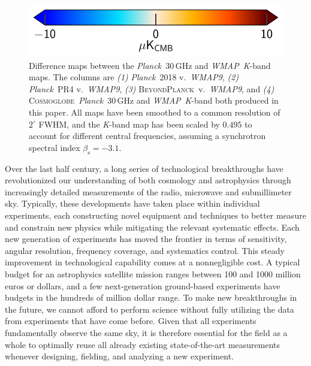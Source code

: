 \documentclass[twocolumn]{../../common/aa}
\def\WMAP{\emph{WMAP}}
\def\WMAPnine{\emph{WMAP9}}
\def\Planck{\emph{Planck}}
\newcommand{\BP}{\textsc{BeyondPlanck}}
\newcommand{\cosmoglobe}{\textsc{Cosmoglobe}}
\newcommand{\K}[0]{\textit K}
\begin{document}
\begin{figure}
        \hspace*{40mm}\includegraphics[width=0.25\textheight]{figures/cbar_10uK.pdf}
	\caption{Difference maps between the \Planck\ 30\,GHz and \WMAP\ \K-band maps. The columns are \textit{(1)} \Planck\ 2018 v.~\WMAPnine, \textit{(2)} \Planck\ PR4 v.~\WMAPnine, \textit{(3)} \BP\ v.~\WMAPnine, and \textit{(4)} \cosmoglobe\ \Planck\ 30\,GHz and \WMAP\ \K-band both produced in this paper. All maps have been smoothed to a common resolution of $2^\circ$ FWHM, and the \K-band map has been scaled by $0.495$ to account for different central frequencies, assuming a synchrotron spectral index $\beta_\mathrm s=-3.1$.}
	\label{fig:diff_history}
\end{figure}

Over the last half century, a long series of technological breakthroughs have revolutionized our understanding of both cosmology and astrophysics through increasingly detailed measurements of the radio, microwave and submillimeter sky. Typically, these developments have taken place within individual experiments, each constructing novel equipment and techniques to better measure and constrain new physics while mitigating the relevant systematic effects. Each new generation of experiments has moved the frontier in terms of sensitivity, angular resolution, frequency coverage, and systematics control. This steady improvement in technological capability comes at a nonnegligible cost. A typical budget for an astrophysics satellite mission ranges between 100 and 1000 million euros or dollars, and a few next-generation ground-based experiments have budgets in the hundreds of million dollar range. To make new breakthroughs in the future, we cannot afford to perform science without fully utilizing the data from experiments that have come before.  Given that all experiments fundamentally observe the same sky, it is therefore essential for the field as a whole to optimally reuse all already existing state-of-the-art measurements whenever designing, fielding, and analyzing a new experiment.
\end{document}
